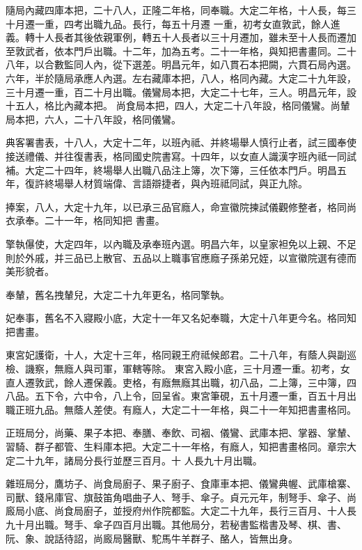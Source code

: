 \begin{pinyinscope}
 隨局內藏四庫本把，二十八人，正隆二年格，同奉職。大定二年格，十人長，每三十月遷一重，四考出職九品。長行，每五十月遷
 一重，初考女直敦武，餘人進義。轉十人長者其後依親軍例，轉五十人長者以三十月遷加，雖未至十人長而遷加至敦武者，依本門戶出職。十二年，加為五考。二十一年格，與知把書畫同。二十八年，以合數監同人內，從下選差。明昌元年，如八貫石本把闕，六貫石局內選。六年，半於隨局承應人內選。左右藏庫本把，八人，格同內藏。大定二十九年設，三十月遷一重，百二十月出職。儀鸞局本把，大定二十七年，三人。明昌元年，設十五人，格比內藏本把。
 尚食局本把，四人，大定二十八年設，格同儀鸞。尚輦局本把，六人，二十八年設，格同儀鸞。



 典客署書表，十八人，大定十二年，以班內祗、并終場舉人慎行止者，試三國奉使接送禮儀、并往復書表，格同國史院書寫。十四年，以女直人識漢字班內祗一同試補。大定二十四年，終場舉人出職八品注上簿，次下簿，三任依本門戶。明昌五年，復許終場舉人材質端偉、言語辯捷者，與內班祗同試，與正九除。



 捧案，八人，大定十九年，以已承三品官廕人，命宣徽院揀試儀觀修整者，格同尚衣承奉。二十一年，格同知把
 書畫。



 擎執儤使，大定四年，以內職及承奉班內選。明昌六年，以皇家袒免以上親、不足則於外戚，并三品已上散官、五品以上職事官應廕子孫弟兄姪，以宣徽院選有德而美形貌者。



 奉輦，舊名拽輦兒，大定二十九年更名，格同擎執。



 妃奉事，舊名不入寢殿小底，大定十一年又名妃奉職，大定十八年更今名。格同知把書畫。



 東宮妃護衛，十人，大定十三年，格同親王府祗候郎君。二十八年，有蔭人與副巡檢、譏察，無廕人與司軍，軍轄等除。
 東宮入殿小底，三十月遷一重。初考，女直人遷敦武，餘人遷保義。吏格，有廕無廕其出職，初八品，二上簿，三中簿，四八品。五下令，六中令，八上令，回呈省。東宮筆硯，五十月遷一重，百五十月出職正班九品。無蔭人差使。有廕人，大定二十一年格，與二十一年知把書畫格同。



 正班局分，尚藥、果子本把、奉膳、奉飲、司裀、儀鸞、武庫本把、掌器、掌輦、習騎、群子都管、生料庫本把。大定二十一年格，有廕人，知把書畫格同。章宗大定二十九年，諸局分長行並歷三百月。十
 人長九十月出職。



 雜班局分，鷹坊子、尚食局廚子、果子廚子、食庫車本把、儀鸞典幄、武庫槍寨、司獸、錢帛庫官、旗鼓笛角唱曲子人、弩手、傘子。貞元元年，制弩手、傘子、尚廄局小底、尚食局廚子，並授府州作院都監。大定二十九年，長行三百月、十人長九十月出職。弩手、傘子四百月出職。其他局分，若秘書監楷書及琴、棋、書、阮、象、說話待詔，尚廄局醫獸、駝馬牛羊群子、酪人，皆無出身。




\end{pinyinscope}

